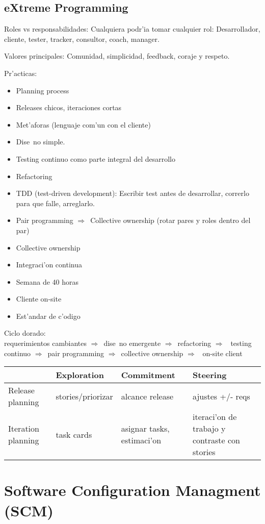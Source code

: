 \documentclass[a4paper,spanish]{article}
\newcommand{\then}[0]{\ensuremath{\Rightarrow}~}
\newenvironment{items}{
		\vspace*{-\topsep}
		\begin{itemize} 
		\addtolength{\itemsep}{-0.5\baselineskip}
		}{\end{itemize}\vspace*{-\topsep}}
\begin{document}
\subsection{eXtreme Programming}

Roles vs responsabilidades: Cualquiera podr'ia tomar cualquier rol: 
	Desarrollador, cliente, tester, tracker, consultor, coach, manager.
	
Valores principales: Comunidad, simplicidad, feedback, coraje y respeto.

Pr'acticas:
\begin{items}
\item Planning process
\item Releases chicos, iteraciones cortas
\item Met'aforas (lenguaje com'un con el cliente)
\item Dise~no simple.
\item Testing continuo como parte integral del desarrollo
\item Refactoring
\item TDD (test-driven development): Escribir test antes de desarrollar, 
	correrlo para que falle, arreglarlo.
\item Pair programming \then Collective ownership (rotar pares y roles dentro
	del par)
\item Collective ownership
\item Integraci'on continua
\item Semana de 40 horas
\item Cliente on-site
\item Est'andar de c'odigo
\end{items}

Ciclo dorado: \\
requerimientos cambiantes \then dise~no emergente \then refactoring \then
testing continuo \then pair programming \then collective ownership \then
on-site client

\begin{tabular}{l|l|l|l}
& Exploration & Commitment & Steering \\
\hline
Release planning & stories/priorizar & alcance release & ajustes +/- reqs \\
\hline
Iteration planning & task cards & asignar tasks, estimaci'on & iteraci'on de
	trabajo y contraste con stories
\end{tabular}

\section{Software Configuration Managment (SCM)}
\end{document}

